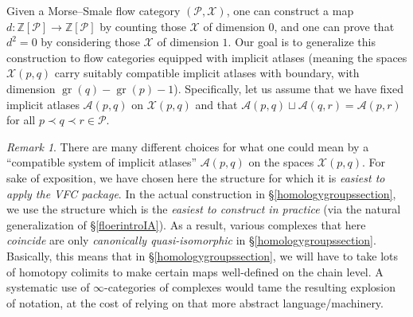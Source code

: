 \documentclass[12pt]{article}
\theoremstyle{definition}
\theoremstyle{remark}
\newtheorem{remark}[theorem]{Remark}
\numberwithin{equation}{subsection}
\newcommand{\X}{\mathcal X}
\newcommand{\ZZ}{\mathbb Z}
\newcommand{\PPP}{\mathcal P}
\newcommand{\A}{\mathcal A}
\newcommand{\gr}{\operatorname{gr}}
\begin{document}
Given a Morse--Smale flow category $(\PPP,\X)$, one can construct a map $d:\ZZ[\PPP]\to\ZZ[\PPP]$ by counting those $\X$ of dimension $0$, and one can prove that $d^2=0$ by considering those $\X$ of dimension $1$.  Our goal is to generalize this construction to flow categories equipped with implicit atlases (meaning the spaces $\X(p,q)$ carry suitably compatible implicit atlases with boundary, with dimension $\gr(q)-\gr(p)-1$).  Specifically, let us assume that we have fixed implicit atlases $\A(p,q)$ on $\X(p,q)$ and that $\A(p,q)\sqcup\A(q,r)=\A(p,r)$ for all $p\prec q\prec r\in\PPP$.

\begin{remark}
There are many different choices for what one could mean by a ``compatible system of implicit atlases'' $\A(p,q)$ on the spaces $\X(p,q)$.  For sake of exposition, we have chosen here the structure for which it is \emph{easiest to apply the VFC package}.  In the actual construction in \S\ref{homologygroupssection}, we use the structure which is the \emph{easiest to construct in practice} (via the natural generalization of \S\ref{floerintroIA}).  As a result, various complexes that here \emph{coincide} are only \emph{canonically quasi-isomorphic} in \S\ref{homologygroupssection}.  Basically, this means that in \S\ref{homologygroupssection}, we will have to take lots of homotopy colimits to make certain maps well-defined on the chain level.  A systematic use of $\infty$-categories of complexes would tame the resulting explosion of notation, at the cost of relying on that more abstract language/machinery.
\end{remark}
\end{document}
